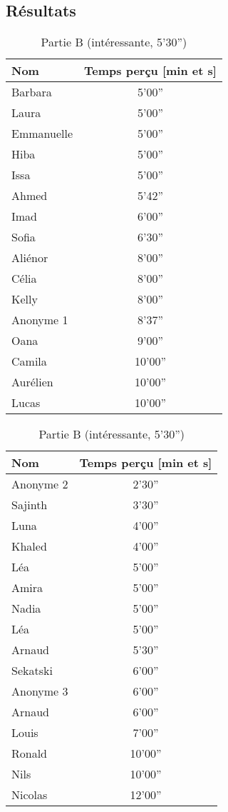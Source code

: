 \documentclass[12pt,fleqn,oneside,openany]{book} %
\begin{document}

\subsection{Résultats} \label{ssec:resultats1}

\begin{table}[h!]
\centering
\begin{minipage}[t]{.49\textwidth}
    \caption{Partie A (ennuyante, 5'20'')} \label{tbl:exp1.1A}
	\begin{tabular}{lc}
		\toprule 
		\textbf{Nom} & \textbf{Temps perçu [min et s]}\\ \midrule
		Barbara & 5'00'' \\
		Laura & 5'00'' \\
		Emmanuelle & 5'00'' \\
		Hiba & 5'00'' \\
		Issa & 5'00'' \\
		Ahmed & 5'42'' \\
		Imad & 6'00'' \\
		Sofia & 6'30'' \\
		Aliénor & 8'00'' \\
		Célia & 8'00'' \\
		Kelly & 8'00'' \\
		Anonyme 1 & 8'37'' \\
		Oana & 9'00'' \\
		Camila & 10'00'' \\
		Aurélien & 10'00'' \\
		Lucas & 10'00'' \\ \bottomrule
	\end{tabular}
\end{minipage}
\hfill
\begin{minipage}[t]{.49\textwidth}
	\caption{Partie B (intéressante, 5'30'')} \label{tbl:exp1.1B}
    \begin{tabular}{lc}
		\toprule
		\textbf{Nom} & \textbf{Temps perçu [min et s]} \\ \midrule
		Anonyme 2 & 2'30'' \\
		Sajinth & 3'30'' \\
		Luna & 4'00'' \\
		Khaled & 4'00'' \\
		Léa & 5'00'' \\
		Amira & 5'00'' \\
		Nadia & 5'00'' \\
		Léa & 5'00'' \\
		Arnaud & 5'30'' \\
		Sekatski & 6'00'' \\
		Anonyme 3 & 6'00'' \\
		Arnaud & 6'00'' \\
		Louis & 7'00'' \\
		Ronald & 10'00'' \\
		Nils & 10'00'' \\
		Nicolas & 12'00'' \\ \bottomrule
	\end{tabular}
\end{minipage}
\end{table}
\end{document}
